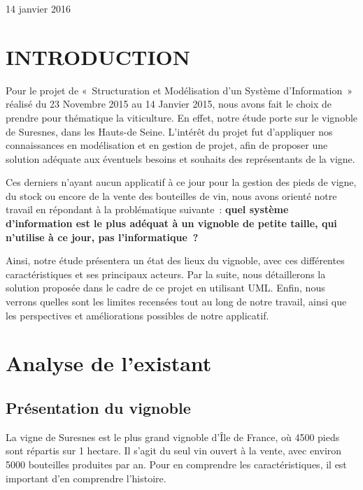 \documentclass[a4paper, titlepage]{report}
\begin{document}
\begin{titlepage}
\begin{sffamily}
\begin{center}
    \vfill

    {\large 14 janvier 2016}

  \end{center}
  \end{sffamily}
\end{titlepage}

\chapter{INTRODUCTION}\label{introduction}

Pour le projet de «~Structuration et Modélisation d'un Système
d'Information~» réalisé du 23 Novembre 2015 au 14 Janvier 2015, nous
avons fait le choix de prendre pour thématique la viticulture. En effet,
notre étude porte sur le vignoble de Suresnes, dans les Hauts-de Seine.
L'intérêt du projet fut d'appliquer nos connaissances en modélisation et
en gestion de projet, afin de proposer une solution adéquate aux
éventuels besoins et souhaits des représentants de la vigne.

Ces derniers n'ayant aucun applicatif à ce jour pour la gestion des
pieds de vigne, du stock ou encore de la vente des bouteilles de vin,
nous avons orienté notre travail en répondant à la problématique
suivante~: \textbf{quel système d'information est le plus adéquat à un
vignoble de petite taille, qui n'utilise à ce jour, pas
l'informatique~?}

Ainsi, notre étude présentera un état des lieux du vignoble, avec ces
différentes caractéristiques et ses principaux acteurs. Par la suite,
nous détaillerons la solution proposée dans le cadre de ce projet en
utilisant UML. Enfin, nous verrons quelles sont les limites recensées
tout au long de notre travail, ainsi que les perspectives et
améliorations possibles de notre applicatif.

\clearpage
\tableofcontents
\clearpage
\listoffigures
\clearpage

\chapter{Analyse de l'existant}\label{analyse-de-lexistant}

\section{Présentation du vignoble}\label{presentation-du-vignoble}

La vigne de Suresnes est le plus grand vignoble d'Île de France, où 4500
pieds sont répartis sur 1 hectare. Il s'agit du seul vin ouvert à la
vente, avec environ 5000 bouteilles produites par an. Pour en comprendre
les caractéristiques, il est important d'en comprendre l'histoire.
\end{document}
